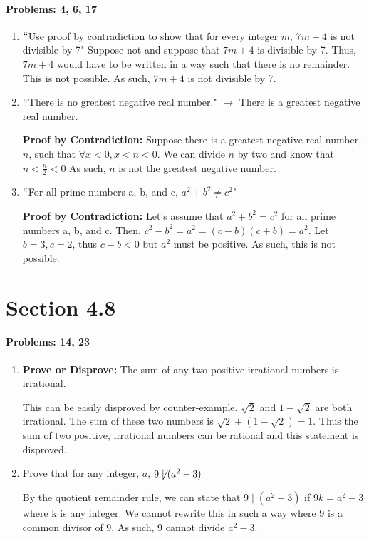 \documentclass{article}
\makeatletter
\newcommand\setItemnumber[1]{\setcounter{enum\romannumeral\@enumdepth}{\numexpr#1-1\relax}}
\makeatother
\begin{document}
\paragraph{Problems: 4, 6, 17}
\begin{enumerate}
    \setItemnumber{4}
    \item $``$Use proof by contradiction to show that for every integer $m$, $7m+4$ is not divisible by 7"
    Suppose not and suppose that $7m+4$ is divisible by 7. Thus, $7m+4$ would have to be written in a way such that there is no remainder. This is not possible. As such, $7m+4$ is not divisible by 7. \lightning

    \setItemnumber{6}
    \item $``$There is no greatest negative real number." $\rightarrow$ There is a greatest negative real number.
    
    \textbf{Proof by Contradiction: } Suppose there is a greatest negative real number, $n$, such that $\forall x<0, x<n<0$. We can divide $n$ by two and know that $n<\frac{n}{2}<0$ As such, $n$ is not the greatest negative number. \lightning

    \setItemnumber{17}
    \item $``$For all prime numbers a, b, and c, $a^2+b^2\neq c^2$"

    \textbf{Proof by Contradiction:} Let's assume that $a^2+b^2=c^2$ for all prime numbers a, b, and c.
    Then, $c^2-b^2 = a^2 = (c-b)(c+b) = a^2$. Let $b=3, c=2$, thus $c-b < 0$ but $a^2$ must be positive. As such, this is not possible. \lightning
\end{enumerate}
\section{Section 4.8}
\paragraph{Problems: 14, 23}
\begin{enumerate}
    \setItemnumber{14}
    \item \textbf{Prove or Disprove: } The sum of any two positive irrational numbers is irrational.

    This can be easily disproved by counter-example. $\sqrt2$ and $1-\sqrt2$ are both irrational. The sum of these two numbers is $\sqrt2 + (1-\sqrt2) = 1$. Thus the
    sum of two positive, irrational numbers can be rational and this statement is disproved.
    \setItemnumber{23}
    \item Prove that for any integer, $a$, $9\not\mid(a^2-3)$ 

    By the quotient remainder rule, we can state that $9\mid(a^2-3)$ if $9k = a^2-3$ where k is any integer. We cannot rewrite this in such a way where 9 is a common divisor of 9. As such, 9 cannot divide $a^2-3$.
\end{enumerate}
\end{document}
